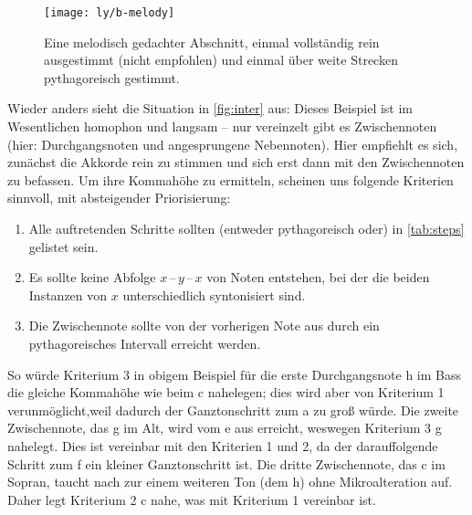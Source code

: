\begin{figure}
  \centering
  \texttt{[image: ly/b-melody]}
  \caption{Eine melodisch gedachter Abschnitt, einmal
    vollständig rein ausgestimmt (nicht empfohlen) und einmal über weite
    Strecken pythagoreisch gestimmt.}\label{fig:melody}
\end{figure}

Wieder anders sieht die Situation in \cref{fig:inter} aus: Dieses Beispiel ist
im Wesentlichen homophon und langsam – nur vereinzelt gibt es Zwischennoten
(hier: Durchgangsnoten und angesprungene Nebennoten). Hier empfiehlt es sich,
zunächst die Akkorde rein zu stimmen und sich erst dann mit den Zwischennoten zu
befassen. Um ihre Kommahöhe zu ermitteln, scheinen uns folgende Kriterien
sinnvoll, mit absteigender Priorisierung:
\begin{enumerate}
\item Alle auftretenden Schritte sollten (entweder pythagoreisch oder) in \cref{tab:steps}
  gelistet sein.
\item Es sollte keine Abfolge $x$\,–\,$y$\,–\,$x$ von Noten entstehen, bei der
  die beiden Instanzen von $x$ unterschiedlich syntonisiert sind.
\item Die Zwischennote sollte von der vorherigen Note aus durch ein
  pythagoreisches Intervall erreicht werden.
\end{enumerate}
So würde Kriterium 3 in obigem Beispiel für die erste Durchgangsnote h im Bass
die gleiche Kommahöhe wie beim c nahelegen; dies wird aber von Kriterium 1
verunmöglicht,weil dadurch der Ganztonschritt zum \naturalm a zu groß würde. Die
zweite Zwischennote, das g im Alt, wird vom \naturalm e aus erreicht, weswegen
Kriterium 3 \naturalm g nahelegt. Dies ist vereinbar mit den Kriterien 1 und 2,
da der darauffolgende Schritt zum f ein kleiner Ganztonschritt ist. Die dritte
Zwischennote, das c im Sopran, taucht nach zur einem weiteren Ton (dem \naturalm
h) ohne Mikroalteration auf. Daher legt Kriterium 2 \natural c nahe, was mit
Kriterium 1 vereinbar ist.


